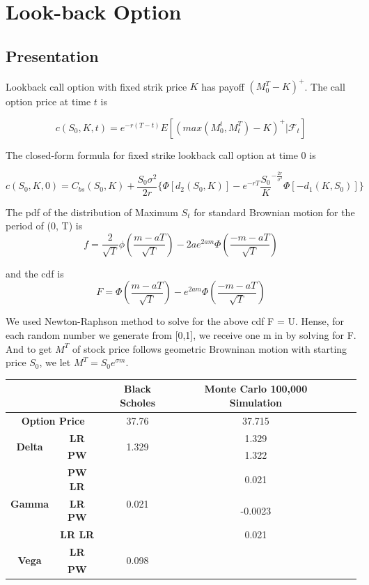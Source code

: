\documentclass[11pt,a4paper,fleqn,draft]{article}
\begin{document}
\section{Look-back Option}
\subsection{Presentation}
Lookback call option with fixed strik price $K$ has payoff $(M^T_{0}-K)^+$. The call option price at time $t$ is

$$c(S_0,K,t) = e^{-r(T-t)}E[(max(M^t_0,M^T_t)-K)^+|\mathcal{F}_t] $$

The closed-form formula for fixed strike lookback call option at time 0 \cite{lectures, exooptions} is

$$c(S_0,K,0)=C_{bs}(S_0,K) + \frac{S_0\sigma^2}{2r}\{ \Phi[d_2(S_0,K)]-e^{-rT}\frac{S_0}{K}^{-\frac{2r}{\sigma^2}} \Phi[-d_1(K,S_0)]\}$$


The pdf of the distribution of Maximum $S_t$ for standard Brownian motion for the period of (0, T) is
$$f = \frac{2}{\sqrt{T}}\phi\left(\frac{m-aT}{\sqrt{T}}\right)-2ae^{2am}\Phi\left(\frac{-m-aT}{\sqrt{T}}\right)$$

and the cdf is
$$F = \Phi\left(\frac{m-aT}{\sqrt{T}}\right)-e^{2am}\Phi\left(\frac{-m-aT}{\sqrt{T}}\right)$$

We used Newton-Raphson method to solve for the above cdf F = U. Hense, for each random number we generate from [0,1], we receive one m in by solving for F. And to get $M^T$ of stock price follows geometric Browninan motion with starting price $S_0$, we let $M^T=S_0e^{\sigma m }$.\\

\begin{tabular}{|c|c|c|c|c|c|}
\hline
\multicolumn{2}{|l|}{}             & \textbf{Black Scholes} & \textbf{Monte Carlo 100,000 Simulation} \\ \hline
\multicolumn{2}{|c|}{\textbf{Option Price}}      & 37.76 &  37.715       \\ \hline
\multirow{2}{*}{\textbf{Delta}} & \textbf{LR}    & \multirow{2}{*}{1.329}                &1.329      \\
                                & \textbf{PW}    &                                          & 1.322              \\ \hline
\multirow{3}{*}{\textbf{Gamma}} & \textbf{PW LR} & \multirow{3}{*}{0.021}                 & 0.021       \\
                                & \textbf{LR PW} &                                           & -0.0023      \\
                                & \textbf{LR LR} &                                          & 0.021        \\ \hline
\multirow{2}{*}{\textbf{Vega}}  & \textbf{LR}    & \multirow{2}{*}{0.098} &          \\
                                & \textbf{PW}    &                                             &          \\ \hline
\end{tabular}\\
\end{document}
